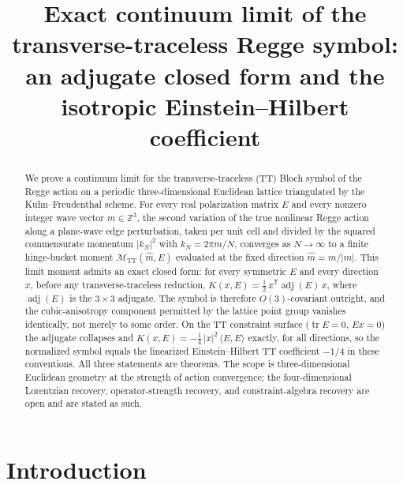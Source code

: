 \documentclass[11pt]{article}
\title{Exact continuum limit of the transverse-traceless Regge symbol:\\
an adjugate closed form and the isotropic Einstein--Hilbert coefficient}
\author{}
\date{}
\theoremstyle{definition}
\theoremstyle{remark}
\DeclareMathOperator{\adjE}{adj}
\DeclareMathOperator{\tr}{tr}
\newcommand{\Z}{\mathbb{Z}}
\newcommand{\TT}{\mathrm{TT}}
\newcommand{\trans}{\mathsf{T}}
\begin{document}
\maketitle

\begin{abstract}
We prove a continuum limit for the transverse-traceless (TT) Bloch symbol of the Regge action on a periodic three-dimensional Euclidean lattice triangulated by the Kuhn--Freudenthal scheme. For every real polarization matrix $E$ and every nonzero integer wave vector $m\in\Z^{3}$, the second variation of the true nonlinear Regge action along a plane-wave edge perturbation, taken per unit cell and divided by the squared commensurate momentum $|k_N|^2$ with $k_N = 2\pi m/N$, converges as $N\to\infty$ to a finite hinge-bucket moment $\mathcal{M}_{\TT}(\hat m, E)$ evaluated at the fixed direction $\hat m = m/|m|$. This limit moment admits an exact closed form: for every symmetric $E$ and every direction $x$, before any transverse-traceless reduction, $K(x,E)=\tfrac12\, x^{\trans}\adjE(E)\,x$, where $\adjE(E)$ is the $3\times 3$ adjugate. The symbol is therefore $O(3)$-covariant outright, and the cubic-anisotropy component permitted by the lattice point group vanishes identically, not merely to some order. On the TT constraint surface ($\tr E = 0$, $Ex = 0$) the adjugate collapses and $K(x,E) = -\tfrac14\,|x|^2\,\langle E,E\rangle$ exactly, for all directions, so the normalized symbol equals the linearized Einstein--Hilbert TT coefficient $-1/4$ in these conventions. All three statements are theorems. The scope is three-dimensional Euclidean geometry at the strength of action convergence; the four-dimensional Lorentzian recovery, operator-strength recovery, and constraint-algebra recovery are open and are stated as such.
\end{abstract}

\section{Introduction}
\label{sec:intro}
\end{document}

